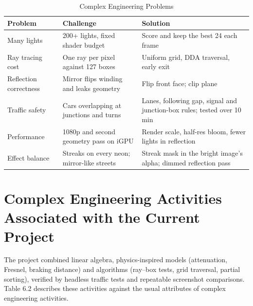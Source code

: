 \documentclass[12pt, a4paper]{report}
\begin{document}
\begin{table}[!htbp]
  \caption{Complex Engineering Problems}
  \label{tab:6.1}
  \centering
  {\fontsize{10}{13}\selectfont
    \begin{tabular}{|p{1.3in}|p{2.1in}|p{2.0in}|}
      \hline
      \textbf{Problem} & \textbf{Challenge} & \textbf{Solution} \\
      \hline
      Many lights & 200+ lights, fixed shader budget & Score and keep the best 24 each frame \\
      \hline
      Ray tracing cost & One ray per pixel against 127 boxes & Uniform grid, DDA traversal, early exit \\
      \hline
      Reflection correctness & Mirror flips winding and leaks geometry & Flip front face; clip plane \\
      \hline
      Traffic safety & Cars overlapping at junctions and turns & Lanes, following gap, signal and junction-box rules; tested over 10 min \\
      \hline
      Performance & 1080p and second geometry pass on iGPU & Render scale, half-res bloom, fewer lights in reflection \\
      \hline
      Effect balance & Streaks on every neon; mirror-like streets & Streak mask in the bright image's alpha; dimmed reflection pass \\
      \hline
    \end{tabular}
  }
\end{table}

\section{Complex Engineering Activities Associated with the Current Project}

\begin{justify}
  {\fontsize{12}{13.8}\selectfont
    The project combined linear algebra, physics-inspired models (attenuation, Fresnel, braking distance) and algorithms (ray--box tests, grid traversal, partial sorting), verified by headless traffic tests and repeatable screenshot comparisons. Table 6.2 describes these activities against the usual attributes of complex engineering activities.
  }
\end{justify}
\end{document}
